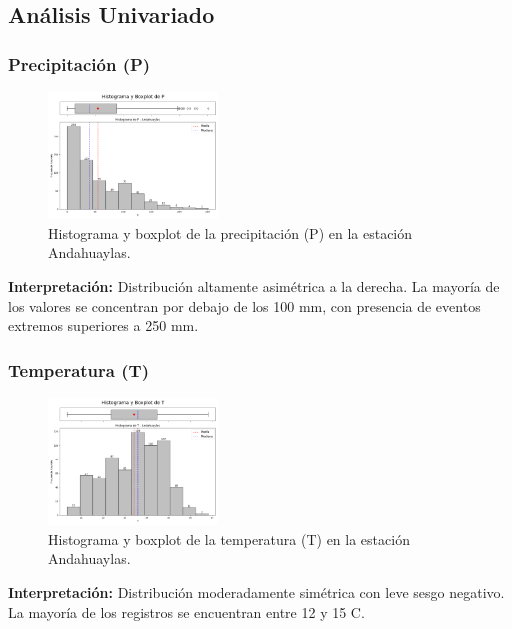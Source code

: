 \subsection{Análisis Univariado}

\subsubsection*{Precipitación (P)}
\begin{figure}[H]
\centering
\includegraphics[width=0.4\textwidth]{resultados/por_estacion_meteorologica/Andahuaylas/P_histograma.png}
\caption{Histograma y boxplot de la precipitación (P) en la estación Andahuaylas.}
\label{fig:andahuaylas_P}
\end{figure}
\textbf{Interpretación:} Distribución altamente asimétrica a la derecha. La mayoría de los valores se concentran por debajo de los 100 mm, con presencia de eventos extremos superiores a 250 mm.

\subsubsection*{Temperatura (T)}
\begin{figure}[H]
\centering
\includegraphics[width=0.4\textwidth]{resultados/por_estacion_meteorologica/Andahuaylas/T_histograma.png}
\caption{Histograma y boxplot de la temperatura (T) en la estación Andahuaylas.}
\label{fig:andahuaylas_T}
\end{figure}
\textbf{Interpretación:} Distribución moderadamente simétrica con leve sesgo negativo. La mayoría de los registros se encuentran entre 12 y 15 \textdegree C.

